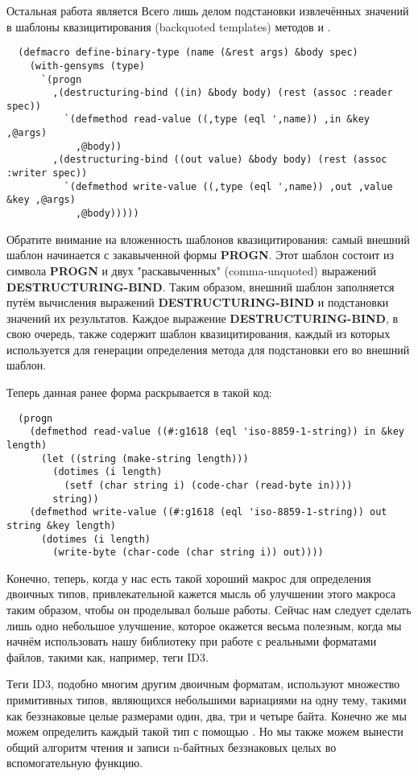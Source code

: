 Остальная работа является Всего лишь делом подстановки извлечённых значений в шаблоны
квазицитирования (backquoted templates) методов  и .

\begin{lstlisting}
  (defmacro define-binary-type (name (&rest args) &body spec)
    (with-gensyms (type)
      `(progn
        ,(destructuring-bind ((in) &body body) (rest (assoc :reader spec))
          `(defmethod read-value ((,type (eql ',name)) ,in &key ,@args)
            ,@body))
        ,(destructuring-bind ((out value) &body body) (rest (assoc :writer spec))
          `(defmethod write-value ((,type (eql ',name)) ,out ,value &key ,@args)
            ,@body)))))
\end{lstlisting}

Обратите внимание на вложенность шаблонов квазицитирования: самый внешний шаблон начинается с закавыченной формы \textbf{PROGN}. Этот шаблон состоит из символа \textbf{PROGN} и двух "раскавыченных" (comma-unquoted) выражений \textbf{DESTRUCTURING-BIND}. Таким образом, внешний шаблон заполняется путём вычисления выражений \textbf{DESTRUCTURING-BIND} и подстановки значений их результатов. Каждое выражение \textbf{DESTRUCTURING-BIND}, в свою очередь, также содержит шаблон квазицитирования, каждый из которых используется для генерации определения метода для подстановки его во внешний шаблон.

Теперь данная ранее форма  раскрывается в такой код:

\begin{lstlisting}
  (progn
    (defmethod read-value ((#:g1618 (eql 'iso-8859-1-string)) in &key length)
      (let ((string (make-string length)))
        (dotimes (i length)
          (setf (char string i) (code-char (read-byte in))))
        string))
    (defmethod write-value ((#:g1618 (eql 'iso-8859-1-string)) out string &key length)
      (dotimes (i length)
        (write-byte (char-code (char string i)) out))))
\end{lstlisting}

Конечно, теперь, когда у нас есть такой хороший макрос для определения двоичных типов,
привлекательной кажется мысль об улучшении этого макроса таким образом, чтобы он
проделывал больше работы. Сейчас нам следует сделать лишь одно небольшое улучшение,
которое окажется весьма полезным, когда мы начнём использовать нашу библиотеку при работе
с реальными форматами файлов, такими как, например, теги ID3.

Теги ID3, подобно многим другим двоичным форматам, используют множество примитивных типов,
являющихся небольшими вариациями на одну тему, такими как беззнаковые целые размерами
один, два, три и четыре байта. Конечно же мы можем определить каждый такой тип с помощью
. Но мы также можем вынести общий алгоритм чтения и записи
n-байтных беззнаковых целых во вспомогательную функцию.

